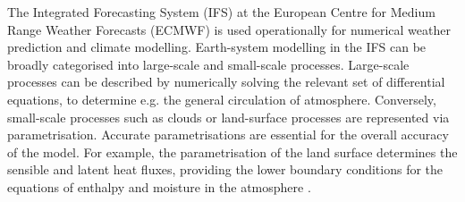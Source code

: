 \documentclass[hess, twostagejnl]{copernicus}
\begin{document}
\noindent The Integrated Forecasting System (IFS) at the European Centre for Medium Range Weather Forecasts (ECMWF) is used operationally for numerical weather prediction and climate modelling. Earth-system modelling in the IFS can be broadly categorised into large-scale and small-scale processes. Large-scale processes can be described by numerically solving the relevant set of differential equations, to determine e.g. the general circulation of atmosphere. Conversely, small-scale processes such as clouds or land-surface processes are represented via parametrisation. Accurate parametrisations are essential for the overall accuracy of the model. For example, the parametrisation of the land surface determines the sensible and latent heat fluxes, providing the lower boundary conditions for the equations of enthalpy and moisture in the atmosphere \citep{p16960}. \newline 
\end{document}
